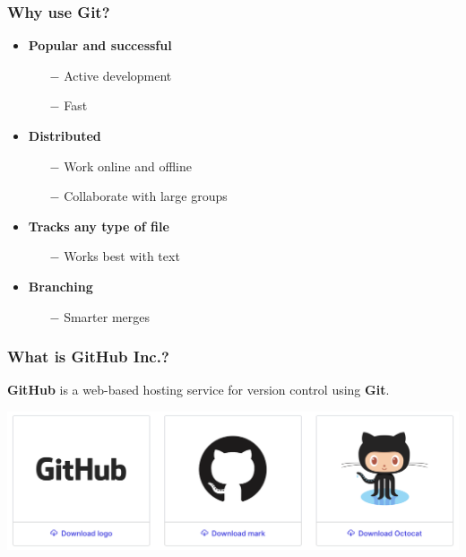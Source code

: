 \documentclass[svgnames]{beamer}
\begin{document}
\begin{frame}
    \frametitle{Why use Git?}
    \begin{itemize}
        \item \textbf{Popular and successful}
            \begin{itemize}
                \item[$-$]{Active development}
                \item[$-$]{Fast}
                    \hfill \break
            \end{itemize}

        \item \textbf{Distributed}
            \begin{itemize}
                \item[$-$]{Work online and offline}
                \item[$-$]{Collaborate with large groups}
                    \hfill \break
            \end{itemize}

        \item \textbf{Tracks any type of file}
            \begin{itemize}
                \item[$-$]{Works best with text}
                    \hfill \break
            \end{itemize}

        \item \textbf{Branching}
            \begin{itemize}
                \item[$-$]{Smarter merges}
            \end{itemize}
    \end{itemize}
\end{frame}


\begin{frame}
    \frametitle{What is GitHub Inc.?}

    \begin{center}
        \textbf{GitHub} is a web-based hosting service for version control using \textbf{Git}.
    \end{center}

    \begin{center}
        \includegraphics[scale=0.2]{img/github_logos.png}
    \end{center}
\end{frame}
\end{document}
